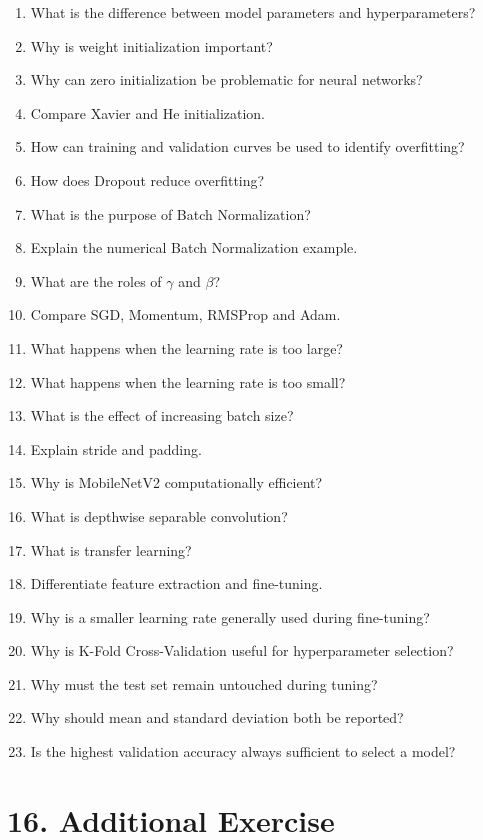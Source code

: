 \documentclass[10pt]{article}
\begin{document}
\begin{enumerate}
\item What is the difference between model parameters and hyperparameters?
\item Why is weight initialization important?
\item Why can zero initialization be problematic for neural networks?
\item Compare Xavier and He initialization.
\item How can training and validation curves be used to identify overfitting?
\item How does Dropout reduce overfitting?
\item What is the purpose of Batch Normalization?
\item Explain the numerical Batch Normalization example.
\item What are the roles of $\gamma$ and $\beta$?
\item Compare SGD, Momentum, RMSProp and Adam.
\item What happens when the learning rate is too large?
\item What happens when the learning rate is too small?
\item What is the effect of increasing batch size?
\item Explain stride and padding.
\item Why is MobileNetV2 computationally efficient?
\item What is depthwise separable convolution?
\item What is transfer learning?
\item Differentiate feature extraction and fine-tuning.
\item Why is a smaller learning rate generally used during fine-tuning?
\item Why is K-Fold Cross-Validation useful for hyperparameter selection?
\item Why must the test set remain untouched during tuning?
\item Why should mean and standard deviation both be reported?
\item Is the highest validation accuracy always sufficient to select a model?
\end{enumerate}

\section*{16. Additional Exercise}
\end{document}
